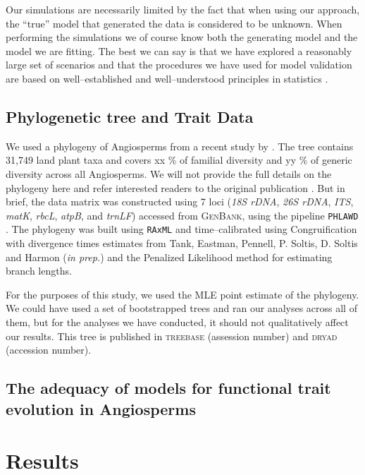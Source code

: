 \documentclass[12pt]{article}
\begin{document}
Our simulations are necessarily limited by the fact that when using our approach, the ``true'' model that generated the data is considered to be unknown. When performing the simulations we of course know both the generating model and the model we are fitting. The best we can say is that we have explored a reasonably large set of scenarios and that the procedures we have used for model validation are based on well--established and well--understood principles in statistics \citep[especially Bayesian statistics; e.g.][]{Gelmanbook}.


\subsection*{Phylogenetic tree and Trait Data}
We used a phylogeny of Angiosperms from a recent study by \citet{ZanneBigTree}. The tree contains 31,749 land plant taxa and covers xx \% of familial diversity and yy \% of generic diversity across all Angiosperms. We will not provide the full details on the phylogeny here and refer interested readers to the original publication \citep{ZanneBigTree}. But in brief, the data matrix was constructed using 7 loci (\textit{18S rDNA}, \textit{26S rDNA}, \textit{ITS}, \textit{matK}, \textit{rbcL}, \textit{atpB}, and \textit{trnLF}) accessed from \textsc{GenBank}, using the pipeline \texttt{PHLAWD} \citep{phlawd}. The phylogeny was built using \texttt{RAxML} \citep{raxml} and time--calibrated using Congruification \citep{Eastmancongruify} with divergence times estimates from Tank, Eastman, Pennell, P. Soltis, D. Soltis and Harmon (\textit{in prep.}) and the Penalized Likelihood method \citep{Sanderson1997, treepl} for estimating branch lengths.

For the purposes of this study, we used the MLE point estimate of the phylogeny. We could have used a set of bootstrapped trees and ran our analyses across all of them, but for the analyses we have conducted, it should not qualitatively affect our results. This tree is published in \textsc{treebase} (assession number) and \textsc{dryad} (accession number).

\subsection*{The adequacy of models for functional trait evolution in Angiosperms}


\section*{Results}
\end{document}
